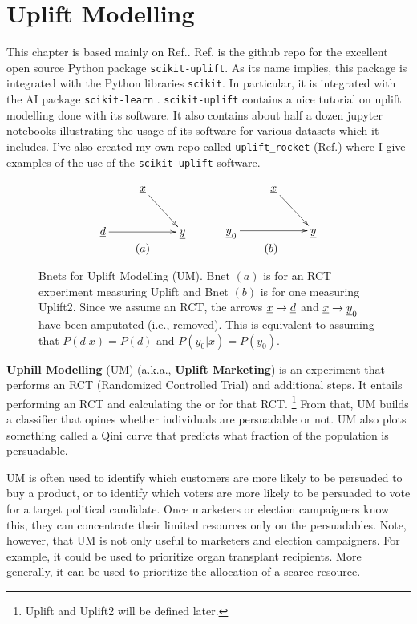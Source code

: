 \chapter{Uplift Modelling}
\label{ch-uplift}


This chapter is based mainly on Ref.\cite{scikit-uplift}.
Ref.\cite{scikit-uplift} is the github repo for
the excellent open source Python package {\tt scikit-uplift}.
As its name implies, this package is
integrated with the Python libraries {\tt scikit}. In particular, it is integrated with
the AI package {\tt scikit-learn} .
 {\tt scikit-uplift} contains a nice tutorial 
 on uplift modelling
 done with its software. It also contains about half a dozen
jupyter notebooks illustrating the usage
of its software for various datasets which it includes. I've also created
my own repo called {\tt uplift\_rocket}
(Ref.\cite{uplift_rocket})
where I give examples of the use of
the {\tt scikit-uplift}  software.



\begin{figure}[h!]
$$\begin{array}{ccc}
\xymatrix{
&\rvx\ar[dr]
\\
\rvd\ar[rr]
&&\rvy
}
&\quad&
\xymatrix{
&\rvx\ar[dr]
\\
\rvy_0\ar[rr]
&&\rvy
}
\\
(a) &\quad & (b)
\end{array}
$$
\caption{Bnets for Uplift Modelling (UM). 
Bnet $(a)$ is for an RCT experiment measuring Uplift and Bnet $(b)$ is for one measuring Uplift2. 
 Since we assume an RCT, the arrows $\rvx\rarrow \rvd$ 
and $\rvx\rarrow \rvy_0$ have been amputated (i.e., removed). This is equivalent to assuming that $P(d|x)=P(d)$ and
$P(y_0|x)=P(y_0)$.
}
\label{fig-up-bnet}
\end{figure}


{\bf Uphill Modelling} (UM) (a.k.a., {\bf Uplift Marketing})
is an experiment that performs an
RCT (Randomized Controlled Trial) and additional steps. It 
entails performing an
RCT  and 
 calculating  the  or  for that  RCT.
 \footnote{Uplift and Uplift2 will be defined later.}
From that, UM builds a classifier that opines whether individuals are
persuadable or not. UM also plots something called a Qini curve that predicts
what fraction of the population is persuadable. 

UM is often used to identify which 
customers are more likely to be persuaded to buy a
product, or to identify which voters are more
likely to be persuaded to vote for a target political candidate.
Once marketers or election campaigners know this, they can concentrate their limited resources only on the persuadables. Note, however, that UM is not only useful
to marketers and election campaigners. For example, it could be used to prioritize organ transplant recipients. 
More generally, it can be used to
prioritize the allocation of 
a scarce resource.

